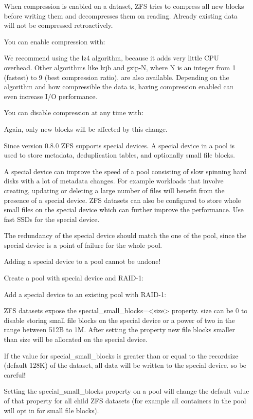 When compression is enabled on a dataset, ZFS tries to compress all new blocks before writing them and decompresses them on reading. Already existing data will not be compressed retroactively.

You can enable compression with:

We recommend using the lz4 algorithm, because it adds very little CPU overhead. Other algorithms like lzjb and gzip-N, where N is an integer from 1 (fastest) to 9 (best compression ratio), are also available. Depending on the algorithm and how compressible the data is, having compression enabled can even increase I/O performance.

You can disable compression at any time with:

Again, only new blocks will be affected by this change.

Since version 0.8.0 ZFS supports special devices. A special device in a pool is used to store metadata, deduplication tables, and optionally small file blocks.

A special device can improve the speed of a pool consisting of slow spinning hard disks with a lot of metadata changes. For example workloads that involve creating, updating or deleting a large number of files will benefit from the presence of a special device. ZFS datasets can also be configured to store whole small files on the special device which can further improve the performance. Use fast SSDs for the special device.

The redundancy of the special device should match the one of the pool, since the special device is a point of failure for the whole pool.

Adding a special device to a pool cannot be undone!

Create a pool with special device and RAID-1:

Add a special device to an existing pool with RAID-1:

ZFS datasets expose the special_small_blocks=<size> property. size can be 0 to disable storing small file blocks on the special device or a power of two in the range between 512B to 1M. After setting the property new file blocks smaller than size will be allocated on the special device.

If the value for special_small_blocks is greater than or equal to the recordsize (default 128K) of the dataset, all data will be written to the special device, so be careful!

Setting the special_small_blocks property on a pool will change the default value of that property for all child ZFS datasets (for example all containers in the pool will opt in for small file blocks).

